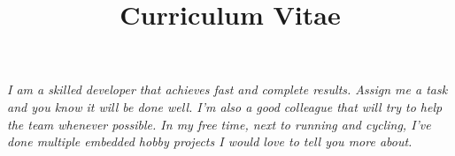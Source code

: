 \documentclass[11pt,a4paper,sans]{moderncv} %
\title{Curriculum Vitae}
\begin{document}




\makecvtitle %


\vspace{-15pt}
\begin{adjustwidth}{50pt}{50pt}
    \textit{I am a skilled developer that achieves fast and complete results.
    Assign me a task and you know it will be done well.
    I'm also a good colleague that will try to help the team whenever possible.
    In my free time, next to running and cycling, I've done multiple embedded hobby projects I would love to tell you more about.}
\end{adjustwidth}
\vspace{10pt}

\end{document}
